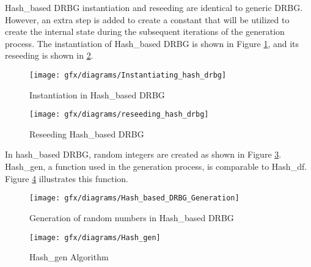 Hash\_based DRBG instantiation and reseeding are identical to generic DRBG. However, an extra step is added to create a constant that will be utilized to create the internal state during the subsequent iterations of the generation process. The instantiation of Hash\_based DRBG is shown in Figure \ref{fig:2:17}, and its reseeding is shown in \ref{fig:2:18}.
\begin{figure}[htbp]
	\centering
	\texttt{[image: gfx/diagrams/Instantiating\_hash\_drbg]}
	\caption{Instantiation in Hash\_based DRBG \cite{SP90A-2015}}
	\label{fig:2:17}
\end{figure}
\begin{figure}[htbp]
	\centering
	\texttt{[image: gfx/diagrams/reseeding\_hash\_drbg]}
	\caption{Reseeding Hash\_based DRBG \cite{SP90A-2015}}
	\label{fig:2:18}
\end{figure}

In hash\_based DRBG, random integers are created as shown in Figure \ref{fig:2:19}. Hash\_gen, a function used in the generation process, is comparable to Hash\_df. Figure \ref{fig:2:20} illustrates this function.
\begin{figure}[htbp]
	\centering
	\texttt{[image: gfx/diagrams/Hash\_based\_DRBG\_Generation]}
	\caption{Generation of random numbers in Hash\_based DRBG \cite{SP90A-2015}}
	\label{fig:2:19}
\end{figure}
\begin{figure}[htbp]
	\centering
	\texttt{[image: gfx/diagrams/Hash\_gen]}
	\caption{Hash\_gen Algorithm \cite{SP90A-2015}}
	\label{fig:2:20}
\end{figure}





